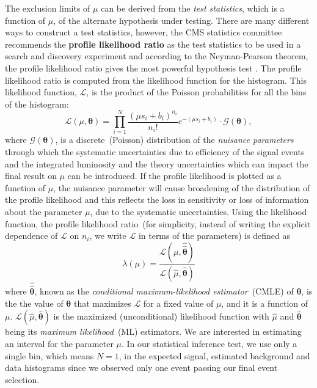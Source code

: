 The exclusion limits of $\mu$ can be derived from the \textit{test statistics}, which is a function of $\mu$, of the alternate hypothesis under testing. There are many different ways to construct a test statistics, however, the CMS statistics committee recommends the \textbf{profile likelihood ratio} as the test statistics to be used in a search and discovery experiment and according to the Neyman-Pearson theorem, the profile likelihood ratio gives the most powerful hypothesis test \cite{NPT}. 
The profile likelihood ratio is computed from the likelihood function for the histogram. This likelihood function, $\mathcal{L}$, is the product of the Poisson probabilities for all the bins of the histogram:
\begin{equation}\label{eq:LL}
\mathcal{L}\left( \mu, \mathbf{\theta} \right) = \prod^{N}_{i=1} \frac{{\left( \mu s_{i} + b_{i} \right)}^{n_{i}}}{n_{i}!} e^{-(\mu s_{i} + b_{i})} \cdot \mathcal{G}(\mathbf{\theta} ),
\end{equation}
where $\mathcal{G}(\mathbf{\theta})$, is a discrete~(Poisson) distribution of the \textit{nuisance parameters} through which the systematic uncertainties due to efficiency of the signal events and the integrated luminosity and the theory uncertainties which can impact the final result on $\mu$ can be introduced. If the profile likelihood is plotted as a function of $\mu$, the nuisance parameter will cause broadening of the distribution of the profile likelihood and this reflects the loss in sensitivity or loss of information about the parameter $\mu$, due to the systematic uncertainties.
\newline
Using the likelihood function, the profile likelihood ratio~(for simplicity, instead of writing the explicit dependence of $\mathcal{L}$ on $n_{i}$, we write  $\mathcal{L}$ in terms of the parameters) is defined as
\begin{equation}\label{eq:PLL}
\lambda(\mu) =  \frac{\mathcal{L}(\mu, \hat{\hat{\mathbf{\theta}}})}{\mathcal{L}(\hat{\mu}, \hat{\mathbf{\theta}} )}
\end{equation}
where $\hat{\hat{\mathbf{\theta}}}$, known as the \textit{conditional maximum-likelihood estimator}~(CMLE) of $\mathbf{\theta}$, is the the value of $\mathbf{\theta}$ that maximizes $\mathcal{L}$ for a fixed value of $\mu$, and it is a function of $\mu$.  $\mathcal{L}(\hat{\mu}, \hat{\mathbf{\theta}} )$ is the maximized (unconditional) likelihood function with $\hat{\mu}$ and $\hat{\mathbf{\theta}}$ being its \textit{maximum likelihood}~(ML) estimators. 
\newline
We are interested in estimating an interval for the parameter $\mu$.
\newline
In our statistical inference test, we use only a single bin, which means $N = 1$, in the expected signal, estimated background and data histograms since we observed only one event passing our final event selection.
